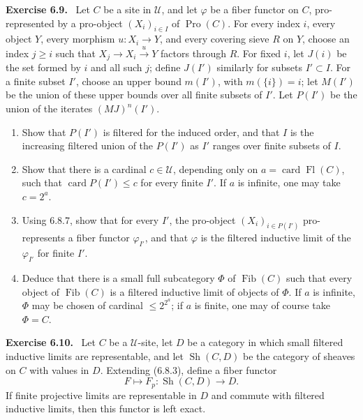 \documentclass[11pt]{article}
\newcommand{\U}{\mathcal{U}}
\newcommand{\Ffib}{\operatorname{Fib}}
\newcommand{\card}{\operatorname{card}}
\newenvironment{remarktext}[1]{\par\medskip\noindent\textbf{#1.}\ }{\par\medskip}
\begin{document}
\begin{remarktext}{Exercise 6.9}
Let \(C\) be a site in \(\U\), and let \(\varphi\) be a fiber functor on \(C\), pro-represented by a pro-object \((X_i)_{i\in I}\) of \(\operatorname{Pro}(C)\). For every index \(i\), every object \(Y\), every morphism \(u:X_i\to Y\), and every covering sieve \(R\) on \(Y\), choose an index \(j\ge i\) such that \(X_j\to X_i\xrightarrow{u}Y\) factors through \(R\). For fixed \(i\), let \(J(i)\) be the set formed by \(i\) and all such \(j\); define \(J(I')\) similarly for subsets \(I'\subset I\). For a finite subset \(I'\), choose an upper bound \(m(I')\), with \(m(\{i\})=i\); let \(M(I')\) be the union of these upper bounds over all finite subsets of \(I'\). Let \(P(I')\) be the union of the iterates \((MJ)^n(I')\).
\begin{enumerate}[label=\alph*)]
\item Show that \(P(I')\) is filtered for the induced order, and that \(I\) is the increasing filtered union of the \(P(I')\) as \(I'\) ranges over finite subsets of \(I\).
\item Show that there is a cardinal \(c\in\U\), depending only on \(a=\card\operatorname{Fl}(C)\), such that \(\card P(I')\le c\) for every finite \(I'\). If \(a\) is infinite, one may take \(c=2^a\).
\item Using 6.8.7, show that for every \(I'\), the pro-object \((X_i)_{i\in P(I')}\) pro-represents a fiber functor \(\varphi_{I'}\), and that \(\varphi\) is the filtered inductive limit of the \(\varphi_{I'}\) for finite \(I'\).
\item Deduce that there is a small full subcategory \(\Phi\) of \(\Ffib(C)\) such that every object of \(\Ffib(C)\) is a filtered inductive limit of objects of \(\Phi\). If \(a\) is infinite, \(\Phi\) may be chosen of cardinal \(\le 2^{2^a}\); if \(a\) is finite, one may of course take \(\Phi=C\).
\end{enumerate}
\end{remarktext}

\begin{remarktext}{Exercise 6.10}
Let \(C\) be a \(\U\)-site, let \(D\) be a category in which small filtered inductive limits are representable, and let \(\operatorname{Sh}(C,D)\) be the category of sheaves on \(C\) with values in \(D\). Extending (6.8.3), define a fiber functor
\begin{equation*}
F\longmapsto F_p:\operatorname{Sh}(C,D)\longrightarrow D.\tag{6.10.1}
\end{equation*}
If finite projective limits are representable in \(D\) and commute with filtered inductive limits, then this functor is left exact.
\end{remarktext}

\bigskip
\end{document}

